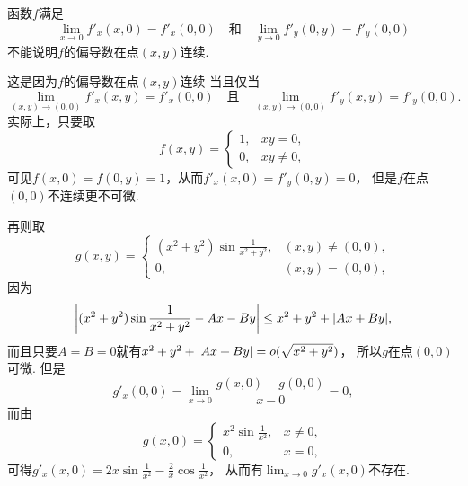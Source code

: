\begin{remark}
函数\(f\)满足\[
	\lim_{x\to0} f'_x(x,0) = f'_x(0,0)
	\quad\text{和}\quad
	\lim_{y\to0} f'_y(0,y) = f'_y(0,0)
\]
不能说明\(f\)的偏导数在点\((x,y)\)连续.

这是因为\(f\)的偏导数在点\((x,y)\)连续
当且仅当\[
	\lim_{(x,y)\to(0,0)} f'_x(x,y) = f'_x(0,0)
	\quad\text{且}\quad
	\lim_{(x,y)\to(0,0)} f'_y(x,y) = f'_y(0,0).
\]
实际上，只要取\[
	f(x,y) = \left\{ \begin{array}{cl}
		1, & xy = 0, \\
		0, & xy \neq 0,
	\end{array} \right.
\]
可见\(f(x,0) = f(0,y) = 1\)，从而\(f'_x(x,0) = f'_y(0,y) = 0\)，
但是\(f\)在点\((0,0)\)不连续更不可微.

再则取\[
	g(x,y) = \left\{ \begin{array}{cl}
		(x^2+y^2) \sin\frac1{x^2+y^2}, & (x,y)\neq(0,0), \\
		0, & (x,y)=(0,0),
	\end{array} \right.
\]
因为\[
	\abs{(x^2+y^2) \sin\frac1{x^2+y^2} - A x - B y}
	\leq x^2 + y^2 + \abs{A x + B y},
\]
而且只要\(A = B = 0\)就有\(x^2 + y^2 + \abs{A x + B y} = o(\sqrt{x^2 + y^2})\)，
所以\(g\)在点\((0,0)\)可微.
但是\begin{equation*}
	g'_x(0,0) = \lim_{x\to0} \frac{g(x,0) - g(0,0)}{x - 0} = 0,
\end{equation*}
而由\[
	g(x,0) = \left\{ \begin{array}{cl}
		x^2 \sin\frac1{x^2}, & x\neq0, \\
		0, & x=0,
	\end{array} \right.
\]可得\(g'_x(x,0) = 2x \sin\frac1{x^2} - \frac2x \cos\frac1{x^2}\)，
从而有\(\lim_{x\to0} g'_x(x,0)\)不存在.
\end{remark}

